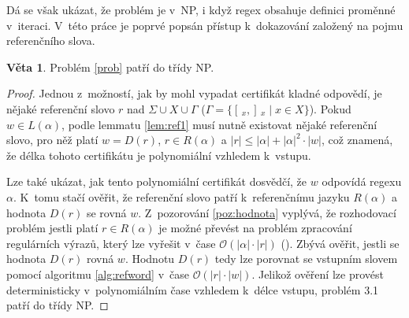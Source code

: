 \documentclass[thesis=B,czech]{FITthesis}[2019/12/23]
\theoremstyle{definition}
\newtheorem{theorem}{Věta}[chapter]
\begin{document}
Dá se však ukázat, že problém je v~NP, i když regex obsahuje definici proměnné v~iteraci. V~této práce je poprvé popsán přístup k~dokazování založený na pojmu referenčního slova.

\begin{theorem}
Problém \ref{prob} patří do třídy NP.
\end{theorem}
\begin{proof} Jednou z~možností, jak by mohl vypadat certifikát kladné odpovědí, je nějaké referenční slovo $r$ nad $\Sigma \cup X \cup \Gamma$ ($\Gamma = \{ [\,_x , ]\,_x \mid x \in X \}$). Pokud $w \in L\left(\alpha\right)$, podle lemmatu \ref{lem:ref1} musí nutně existovat nějaké referenční slovo, pro něž platí $w = D\left(r\right)$, $r \in R\left(\alpha\right)$ a $ |r| \le |\alpha|+|\alpha|^2\cdot|w|$, což znamená, že délka tohoto certifikátu je polynomiální vzhledem k~vstupu.

Lze také ukázat, jak tento polynomiální certifikát dosvědčí, že $w$ odpovídá regexu $\alpha$. K~tomu stačí ověřit, že referenční slovo patří k~referenčnímu jazyku $R\left(\alpha\right)$ a hodnota $D\left(r\right)$ se rovná $w$. Z~pozorování \ref{poz:hodnota} vyplývá, že rozhodovací problém jestli platí $r \in R(\alpha)$ je možné převést na problém zpracování regulárních výrazů, který lze vyřešit v~čase $\mathcal{O}\left(|\alpha| \cdot |r|\right)$ (\cite[s. 282--285]{alfred2014algorithms}). Zbývá ověřit, jestli se hodnota $D\left(r\right)$ rovná $w$. Hodnotu $D\left(r\right)$ tedy lze porovnat se vstupním slovem pomocí algoritmu \ref{alg:refword} v~čase $\mathcal{O}(|r|\cdot|w|)$. Jelikož ověření lze provést deterministicky v~polynomiálním čase vzhledem k~délce vstupu, problém 3.1 patří do třídy NP.
\end{proof}
\end{document}
